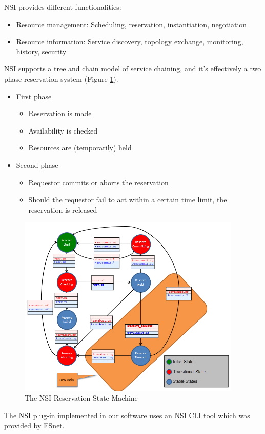 NSI provides different functionalities:
\begin{itemize}
  \item Resource management: Scheduling, reservation, instantiation, negotiation
  \item Resource information: Service discovery, topology exchange, monitoring, history, security
\end{itemize}

NSI supports a tree and chain model of service chaining, and it's effectively a two 
phase reservation system (Figure \ref{fig:NSI_RSM}).

\begin{itemize}
  \item First phase
	\begin{itemize}
		\item Reservation is made
		\item Availability is checked
		\item Resources are (temporarily) held
	\end{itemize}
  \item Second phase
	\begin{itemize}
		\item Requestor commits or aborts the reservation
		\item Should the requestor fail to act within a certain time limit, the reservation is released
	\end{itemize}
\end{itemize}

\begin{figure}[h]
  \centering
  \includegraphics[width=0.95\textwidth]{Figures/NSI_RSM.png}
  \caption{The NSI Reservation State Machine}
  \label{fig:NSI_RSM}
\end{figure} 

The NSI plug-in implemented in our software uses an NSI CLI tool which was provided by ESnet.
